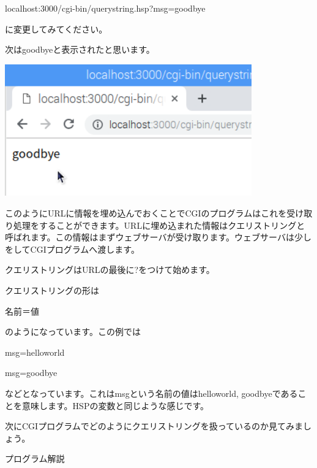 \documentclass[a4paper,12pt,dvipdfmx]{jarticle}
\begin{document}
localhost:3000/cgi-bin/querystring.hsp?msg=goodbye

に変更してみてください。

%


次はgoodbyeと表示されたと思います。


\centering
\includegraphics[width=0.8\textwidth]{ome7-img054.png}
\flushleft

\clearpage

このようにURLに情報を埋め込んでおくことでCGIのプログラムはこれを受け取り処理をすることができます。URLに埋め込まれた情報はクエリストリングと呼ばれます。この情報はまずウェブサーバが受け取ります。ウェブサーバは少しをしてCGIプログラムへ渡します。

クエリストリングはURLの最後に?をつけて始めます。

クエリストリングの形は

名前＝値

のようになっています。この例では

msg=helloworld

msg=goodbye

などとなっています。これはmsgという名前の値はhelloworld,
goodbyeであることを意味します。HSPの変数と同じような感じです。

次にCGIプログラムでどのようにクエリストリングを扱っているのか見てみましょう。


\bigskip

プログラム解説
\end{document}

